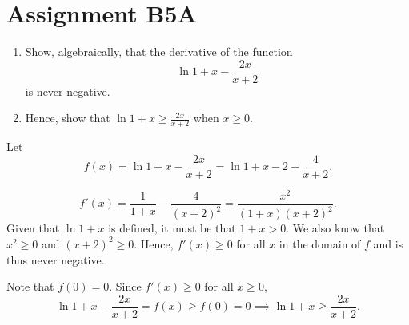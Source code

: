 \section{Assignment B5A}

\begin{problem}
    \begin{enumerate}
        \item Show, algebraically, that the derivative of the function \[\ln{1+x} - \frac{2x}{x+2}\] is never negative.
        \item Hence, show that $\ln{1+x} \geq \frac{2x}{x+2}$ when $x \geq 0$.
    \end{enumerate}
\end{problem}
\begin{solution}
    Let \[f(x) = \ln{1+x} - \frac{2x}{x+2} = \ln{1+x} - 2 + \frac4{x+2}.\]

    \begin{ppart}
        \[f'(x) = \frac1{1+x} - \frac{4}{(x+2)^2} = \frac{x^2}{(1+x)(x+2)^2}.\] Given that $\ln{1+x}$ is defined, it must be that $1 + x > 0$. We also know that $x^2 \geq 0$ and $(x+2)^2 \geq 0$. Hence, $f'(x) \geq 0$ for all $x$ in the domain of $f$ and is thus never negative.
    \end{ppart}
    \begin{ppart}
        Note that $f(0) = 0$. Since $f'(x) \geq 0$ for all $x \geq 0$, \[\ln{1+x} - \frac{2x}{x+2} = f(x) \geq f(0) = 0 \implies \ln{1+x} \geq \frac{2x}{x+2}.\]
    \end{ppart}
\end{solution}

